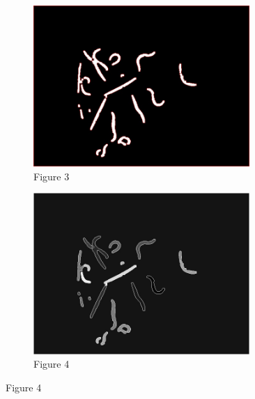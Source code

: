 \documentclass[a4paper,12pt]{article}
\begin{document}
\begin{figure}[ht!]
    \begin{subfigure}{0.5\textwidth}
        \centering
        \includegraphics[width=0.9\textwidth]{A01_step2.jpg}
        \captionsetup{labelformat=empty}
        \caption{Figure 3}
    \end{subfigure}%
    \begin{subfigure}{0.5\textwidth}
        \centering
        \includegraphics[width=0.9\textwidth]{A01_step2_markers.jpg}
        \captionsetup{labelformat=empty}
        \caption{Figure 4}
    \end{subfigure}
\end{figure}
\end{document}
